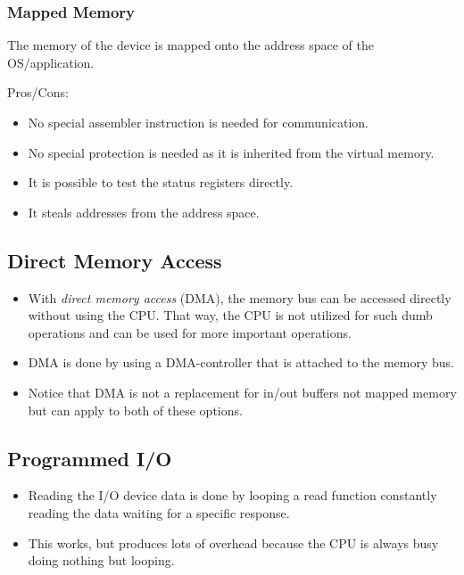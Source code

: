 \documentclass[a4paper, 11pt, accentcolor = tud3b]{tudreport}
\providecommand{\pro}{\item[+]}
\providecommand{\con}{\item[- ]}
\begin{document}
	            \subsubsection{Mapped Memory}
		            The memory of the device is mapped onto the address space of the OS/application.
		            
		            Pros/Cons:
		            \begin{itemize}
		            	\pro No special assembler instruction is needed for communication.
		            	\pro No special protection is needed as it is inherited from the virtual memory.
		            	\pro It is possible to test the status registers directly.
		            	\con It steals addresses from the address space.
		            \end{itemize}
	            
	            \subsection{Direct Memory Access}
		            \begin{itemize}
		            	\item With \textit{direct memory access} (DMA), the memory bus can be accessed directly without using the CPU. That way, the CPU is not utilized for such dumb operations and can be used for more important operations.
		            	\item DMA is done by using a DMA-controller that is attached to the memory bus.
		            	\item Notice that DMA is not a replacement for in/out buffers not mapped memory but can apply to both of these options.
		            \end{itemize}

            \subsection{Programmed I/O}
                \begin{itemize}
                	\item Reading the I/O device data is done by looping a read function constantly reading the data waiting for a specific response.
                	\item This works, but produces lots of overhead because the CPU is always busy doing nothing but looping.
                \end{itemize}
\end{document}
